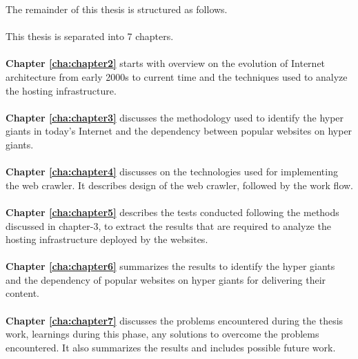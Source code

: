 \noindent The remainder of this thesis is structured as follows.  
\\
\\
\noindent This thesis is separated into 7 chapters.
\\
\\
\textbf{Chapter \ref{cha:chapter2}} starts with overview on the evolution of Internet architecture from early 2000s to current time and the techniques used to analyze the hosting infrastructure.
\\
\\
\textbf{Chapter \ref{cha:chapter3}} discusses the methodology used to identify the hyper giants in today's Internet and the dependency between popular websites on hyper giants.
\\
\\
\textbf{Chapter \ref{cha:chapter4}} discusses on the technologies used for implementing the web crawler. It describes design of the web crawler, followed by the work flow. 
\\
\\
\textbf{Chapter \ref{cha:chapter5}} describes the tests conducted following the methods discussed in chapter-3, to extract the results that are required to analyze the hosting infrastructure deployed by the websites. 
\\
\\
\textbf{Chapter \ref{cha:chapter6}} summarizes the results to identify the hyper giants and the dependency of popular websites on hyper giants for delivering their content.
\\
\\
\textbf{Chapter \ref{cha:chapter7}} discusses the problems encountered during the thesis work, learnings during this phase, any solutions to overcome the problems encountered. It also summarizes the results and includes possible future work. 
\\
\\
